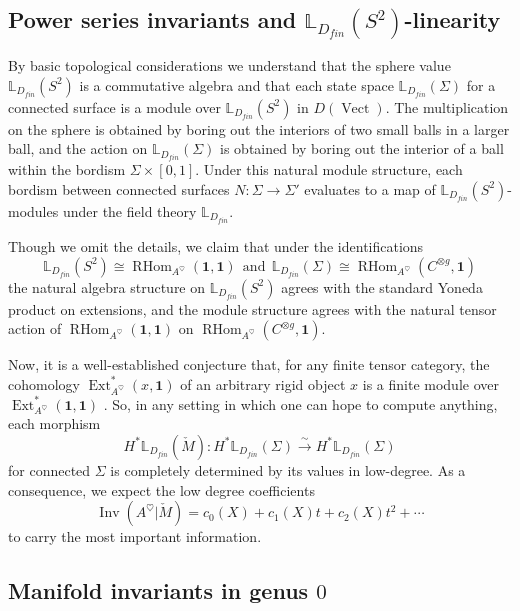 \documentclass[reqno]{amsart}
\theoremstyle{definition}
\newcommand{\mbb}[1]{\mathbb{#1}}
\newcommand{\opn}[1]{\operatorname{#1}}
\newcommand{\ot}{\otimes}
\DeclareMathOperator{\Ext}{Ext}
\renewcommand{\1}{\mathbf{1}}
\begin{document}
\subsection{Power series invariants and $\mbb{L}_{D_{fin}}(S^2)$-linearity}
\label{sect:3d_lin}

By basic topological considerations we understand that the sphere value $\mbb{L}_{D_{fin}}(S^2)$ is a commutative algebra and that each state space $\mbb{L}_{D_{fin}}(\Sigma)$ for a connected surface is a module over $\mbb{L}_{D_{fin}}(S^2)$ in $D(\opn{Vect})$.  The multiplication on the sphere is obtained by boring out the interiors of two small balls in a larger ball, and the action on $\mbb{L}_{D_{fin}}(\Sigma)$ is obtained by boring out the interior of a ball within the bordism $\Sigma\times [0,1]$.  Under this natural module structure, each bordism between connected surfaces $N:\Sigma\to \Sigma'$ evaluates to a map of $\mbb{L}_{D_{fin}}(S^2)$-modules under the field theory $\mbb{L}_{D_{fin}}$.
\par

Though we omit the details, we claim that under the identifications
\[
\mbb{L}_{D_{fin}}(S^2)\cong \opn{RHom}_{A^{\heartsuit}}(\1,\1)\ \ \text{and}\ \ \mbb{L}_{D_{fin}}(\Sigma)\cong \opn{RHom}_{A^{\heartsuit}}(C^{\ot g},\1)
\]
the natural algebra structure on $\mbb{L}_{D_{fin}}(S^2)$ agrees with the standard Yoneda product on extensions, and the module structure agrees with the natural tensor action of $\opn{RHom}_{A^{\heartsuit}}(\1,\1)$ on $\opn{RHom}_{A^{\heartsuit}}(C^{\ot g},\1)$.

Now, it is a well-established conjecture that, for any finite tensor category, the cohomology $\Ext^{\ast}_{A^{\heartsuit}}(x,\1)$ of an arbitrary rigid object $x$ is a finite module over $\Ext^{\ast}_{A^{\heartsuit}}(\1,\1)$ \cite{friedlandersuslin97,etingofostrik04}. So, in any setting in which one can hope to compute anything, each morphism
\[
H^{\ast}\mbb{L}_{D_{fin}}(\check{M}):H^{\ast}\mbb{L}_{D_{fin}}(\Sigma)\overset{\sim}\to H^{\ast}\mbb{L}_{D_{fin}}(\Sigma)
\]
for connected $\Sigma$ is completely determined by its values in low-degree. As a consequence, we expect the low degree coefficients
\[
\opn{Inv}(A^{\heartsuit}|\check{M})=c_0(X)+c_1(X)t+c_2(X)t^2+\cdots
\]
to carry the most important information. 

\subsection{Manifold invariants in genus $0$}
\label{sect:3d_0}
\end{document}
